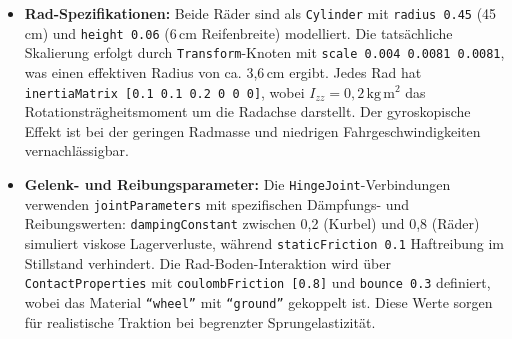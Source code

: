 \begin{itemize}
\begin{itemize}
      \item \textbf{Yaw-Trägheit} \(I_{zz}=0{,}07\,\mathrm{kg\,m^{2}}\): Der Wert ist so gewählt, dass Richtungsänderungen responsiv erfolgen können, ohne dass das System bei schnellen 
      Lenkmanövern instabil wird. Dies ist besonders relevant für die MPC-Spurführung, die präzise Trajektorienverfolgung erfordert.
  \end{itemize}

    Die Null-Werte für alle Off-Diagonalelemente (\(I_{xy} = I_{xz} = I_{yz} = 0\)) bedeuten, dass die Hauptträgheitsachsen mit den 
    Koordinatenachsen des Fahrradmodells ausgerichtet sind. Dies vereinfacht die Regelung erheblich, da keine Kreuzverkopplungen zwischen 
    den Rotationsachsen auftreten. In der Praxis führt dies zu entkoppelten Regelkreisen, da Roll-Bewegungen nicht direkt Pitch- oder Yaw-Bewegungen 
     beeinflussen und umgekehrt. Diese Eigenschaft ist entscheidend für die Stabilität der zweistufigen Regelungsarchitektur, 
    da die Balance-PID-Regelung primär auf Roll-Korrekturen fokussieren kann, ohne komplexe Mehrachsen-Kopplungen berücksichtigen zu müssen.
    
    \item \textbf{Rad-Spezifikationen:} Beide Räder sind als \texttt{Cylinder} mit \texttt{radius 0.45} (45\,cm) und \texttt{height 0.06} (6\,cm Reifenbreite) 
    modelliert. Die tatsächliche Skalierung erfolgt durch \texttt{Transform}-Knoten mit \texttt{scale 0.004 0.0081 0.0081}, was einen effektiven 
    Radius von ca. 3{,}6\,cm ergibt. Jedes Rad hat \texttt{inertiaMatrix [0.1 0.1 0.2 0 0 0]}, wobei \(I_{zz}=0{,}2\,\mathrm{kg\,m^{2}}\) 
    das Rotationsträgheitsmoment um die Radachse darstellt. Der gyroskopische Effekt ist bei der geringen Radmasse und niedrigen 
    Fahrgeschwindigkeiten vernachlässigbar.
    
    \item \textbf{Gelenk- und Reibungsparameter:} Die \texttt{HingeJoint}-Verbindungen verwenden \texttt{jointParameters} mit spezifischen 
    Dämpfungs- und Reibungswerten: \texttt{dampingConstant} zwischen 0{,}2 (Kurbel) und 0{,}8 (Räder) simuliert viskose Lagerverluste, 
    während \texttt{staticFriction 0.1} Haftreibung im Stillstand verhindert. Die Rad-Boden-Interaktion wird über \texttt{ContactProperties} 
    mit \texttt{coulombFriction [0.8]} und \texttt{bounce 0.3} definiert, wobei das Material \texttt{``wheel''} mit \texttt{``ground''} 
    gekoppelt ist. Diese Werte sorgen für realistische Traktion bei begrenzter Sprungelastizität.
    

\end{itemize}
